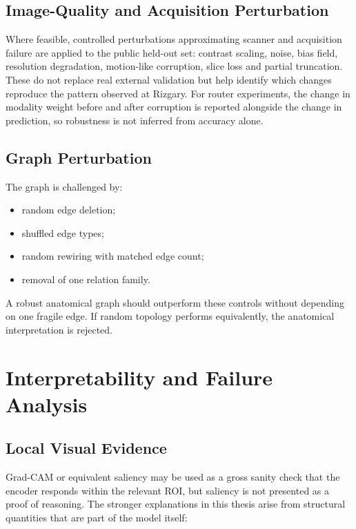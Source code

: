 \subsection{Image-Quality and Acquisition Perturbation}
\label{sec:method-acquisition-robust}

Where feasible, controlled perturbations approximating scanner and acquisition
failure are applied to the public held-out set: contrast scaling, noise, bias
field, resolution degradation, motion-like corruption, slice loss and partial
truncation. These do not replace real external validation but help identify
which changes reproduce the pattern observed at Rizgary. For router experiments,
the change in modality weight before and after corruption is reported alongside
the change in prediction, so robustness is not inferred from accuracy alone.

\subsection{Graph Perturbation}
\label{sec:method-graph-robust}

The graph is challenged by:

\begin{itemize}
  \item random edge deletion;
  \item shuffled edge types;
  \item random rewiring with matched edge count;
  \item removal of one relation family.
\end{itemize}

A robust anatomical graph should outperform these controls without depending on
one fragile edge. If random topology performs equivalently, the anatomical
interpretation is rejected.

\section{Interpretability and Failure Analysis}
\label{sec:method-interpretability}

\subsection{Local Visual Evidence}
\label{sec:method-visual-evidence}

Grad-CAM or equivalent saliency may be used as a gross sanity check that the
encoder responds within the relevant ROI, but saliency is not presented as a
proof of reasoning. The stronger explanations in this thesis arise from
structural quantities that are part of the model itself:


